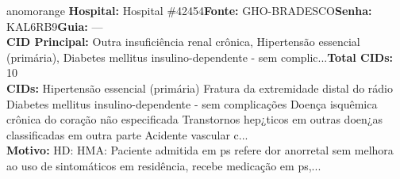 \documentclass[a4paper,10pt]{article}
\begin{document}
\begin{anomalycard}[Interna\c{c}\~{a}o \#120204 | Pac. \#91606 | ALTO (z=3.11) | LOS: 4d | 05/03/2026\,$\to$\,09/03/2026]{anomorange}
\textbf{Hospital:} Hospital \#42454\quad \textbf{Fonte:} GHO-BRADESCO\quad \textbf{Senha:} KAL6RB9\quad \textbf{Guia:} ---\\

\textbf{CID Principal:} {\small Outra insuficiência renal crônica, Hipertensão essencial (primária), Diabetes mellitus insulino-dependente - sem complic...}\quad\textbf{Total CIDs:} 10\\

\textbf{CIDs:} {\scriptsize Hipertensão essencial (primária) \textbar{} Fratura da extremidade distal do rádio \textbar{} Diabetes mellitus insulino-dependente - sem complicações \textbar{} Doença isquêmica crônica do coração não especificada \textbar{} Transtornos hep¿ticos em outras doen¿as classificadas em outra parte \textbar{} Acidente vascular c...}\\

\textbf{Motivo:} {\scriptsize HD:  HMA: Paciente admitida em ps refere dor anorretal sem melhora ao uso de sintomáticos em residência, recebe medicação em ps,...}\\




\end{anomalycard}
\end{document}
